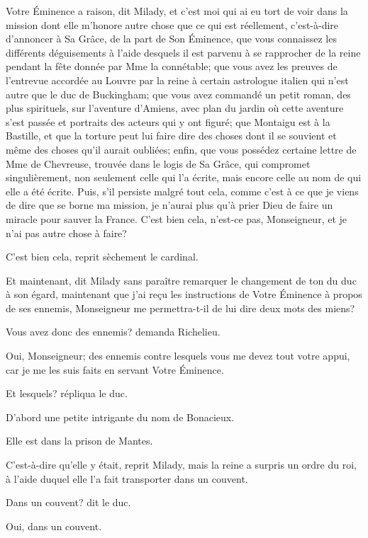 \speak  Votre Éminence a raison, dit Milady, et c'est moi qui ai eu tort de voir dans la mission dont elle m'honore autre chose que ce qui est réellement, c'est-à-dire d'annoncer à Sa Grâce, de la part de Son Éminence, que vous connaissez les différents déguisements à l'aide desquels il est parvenu à se rapprocher de la reine pendant la fête donnée par Mme la connétable; que vous avez les preuves de l'entrevue accordée au Louvre par la reine à certain astrologue italien qui n'est autre que le duc de Buckingham; que vous avez commandé un petit roman, des plus spirituels, sur l'aventure d'Amiens, avec plan du jardin où cette aventure s'est passée et portraits des acteurs qui y ont figuré; que Montaigu est à la Bastille, et que la torture peut lui faire dire des choses dont il se souvient et même des choses qu'il aurait oubliées; enfin, que vous possédez certaine lettre de Mme de Chevreuse, trouvée dans le logis de Sa Grâce, qui compromet singulièrement, non seulement celle qui l'a écrite, mais encore celle au nom de qui elle a été écrite. Puis, s'il persiste malgré tout cela, comme c'est à ce que je viens de dire que se borne ma mission, je n'aurai plus qu'à prier Dieu de faire un miracle pour sauver la France. C'est bien cela, n'est-ce pas, Monseigneur, et je n'ai pas autre chose à faire? 

\speak  C'est bien cela, reprit sèchement le cardinal. 

\speak  Et maintenant, dit Milady sans paraître remarquer le changement de ton du duc à son égard, maintenant que j'ai reçu les instructions de Votre Éminence à propos de ses ennemis, Monseigneur me permettra-t-il de lui dire deux mots des miens? 

\speak  Vous avez donc des ennemis? demanda Richelieu. 

\speak  Oui, Monseigneur; des ennemis contre lesquels vous me devez tout votre appui, car je me les suis faits en servant Votre Éminence. 

\speak  Et lesquels? répliqua le duc. 

\speak  D'abord une petite intrigante du nom de Bonacieux. 

\speak  Elle est dans la prison de Mantes. 

\speak  C'est-à-dire qu'elle y était, reprit Milady, mais la reine a surpris un ordre du roi, à l'aide duquel elle l'a fait transporter dans un couvent. 

\speak  Dans un couvent? dit le duc. 

\speak  Oui, dans un couvent. 

